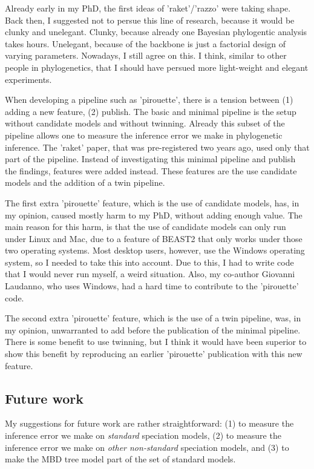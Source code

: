 Already early in my PhD, the first ideas of 'raket'/'razzo' were
taking shape. Back then, I suggested not to persue this line of
research, because it would be clunky and unelegant. Clunky, because
already one Bayesian phylogentic analysis takes hours. Unelegant,
because of the backbone is just a factorial design of varying
parameters. Nowadays, I still agree on this.
I think, similar to other people in phylogenetics,
that I should have persued more light-weight and elegant experiments.

When developing a pipeline such as 'pirouette', there is a tension
between (1) adding a new feature, (2) publish. The basic
and minimal pipeline is the setup without candidate models and without
twinning. Already this subset of the pipeline allows one to 
measure the inference error we make in phylogenetic inference.
The 'raket' paper, that was pre-registered two years ago, used only
that part of the pipeline. Instead of investigating this minimal
pipeline and publish the findings, features were added instead.
These features are the use candidate models and the addition
of a twin pipeline. 

The first extra 'pirouette' feature, which is the use of candidate models,
has, in my opinion, caused mostly harm to my PhD, without adding
enough value. The main reason for this harm, is that the use of candidate
models can only run under Linux and Mac, due to a feature of BEAST2 that
only works under those two operating systems. Most desktop users, however,
use the Windows operating system, so I needed to take this into account.
Due to this, I had to write code that I would never run myself, a weird
situation. Also, my co-author Giovanni Laudanno, who uses Windows, had
a hard time to contribute to the 'pirouette' code. 

The second extra 'pirouette' feature, which is the use of a twin pipeline,
was, in my opinion, unwarranted to add before the publication of the minimal
pipeline. There is some benefit to use twinning, but I think 
it would have been superior to show this benefit by reproducing an earlier
'pirouette' publication with this new feature.

\subsection{Future work}

My suggestions for future work are rather straightforward:
(1) to measure the inference error we make on \emph{standard}
speciation models, (2) to measure the inference error we make 
on \emph{other non-standard} speciation models, and (3) to
make the MBD tree model part of the set of standard models.

